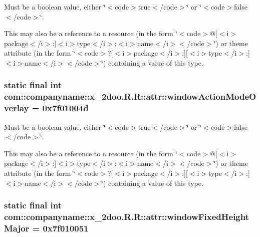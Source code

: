 Must be a boolean value, either \char`\"{}$<$code$>$true$<$/code$>$\char`\"{} or \char`\"{}$<$code$>$false$<$/code$>$\char`\"{}. 

This may also be a reference to a resource (in the form \char`\"{}$<$code$>$@\mbox{[}$<$i$>$package$<$/i$>$:\mbox{]}$<$i$>$type$<$/i$>$:$<$i$>$name$<$/i$>$$<$/code$>$\char`\"{}) or theme attribute (in the form \char`\"{}$<$code$>$?\mbox{[}$<$i$>$package$<$/i$>$:\mbox{]}\mbox{[}$<$i$>$type$<$/i$>$:\mbox{]}$<$i$>$name$<$/i$>$$<$/code$>$\char`\"{}) containing a value of this type. \hypertarget{classcom_1_1companyname_1_1x__2doo_1_1_r_1_1attr_108478131ce031dafd426d3e966086a6}{
\subsubsection[{windowActionModeOverlay}]{\setlength{\rightskip}{0pt plus 5cm}static final int com::companyname::x\_\-2doo.R.R::attr::windowActionModeOverlay = 0x7f01004d}}
\label{classcom_1_1companyname_1_1x__2doo_1_1_r_1_1attr_108478131ce031dafd426d3e966086a6}


Must be a boolean value, either \char`\"{}$<$code$>$true$<$/code$>$\char`\"{} or \char`\"{}$<$code$>$false$<$/code$>$\char`\"{}. 

This may also be a reference to a resource (in the form \char`\"{}$<$code$>$@\mbox{[}$<$i$>$package$<$/i$>$:\mbox{]}$<$i$>$type$<$/i$>$:$<$i$>$name$<$/i$>$$<$/code$>$\char`\"{}) or theme attribute (in the form \char`\"{}$<$code$>$?\mbox{[}$<$i$>$package$<$/i$>$:\mbox{]}\mbox{[}$<$i$>$type$<$/i$>$:\mbox{]}$<$i$>$name$<$/i$>$$<$/code$>$\char`\"{}) containing a value of this type. \hypertarget{classcom_1_1companyname_1_1x__2doo_1_1_r_1_1attr_a910257322d4af4a914613b5f7ddd537}{
\subsubsection[{windowFixedHeightMajor}]{\setlength{\rightskip}{0pt plus 5cm}static final int com::companyname::x\_\-2doo.R.R::attr::windowFixedHeightMajor = 0x7f010051}}
\label{classcom_1_1companyname_1_1x__2doo_1_1_r_1_1attr_a910257322d4af4a914613b5f7ddd537}


